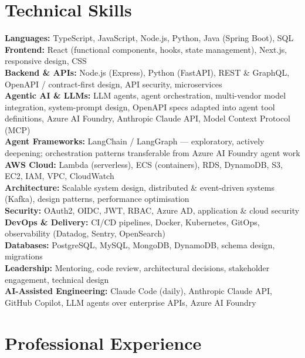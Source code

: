 \documentclass[11pt,a4paper]{article}
\begin{document}
\section*{Technical Skills}
\noindent
\textbf{Languages:} TypeScript, JavaScript, Node.js, Python, Java (Spring Boot), SQL\\
\textbf{Frontend:} React (functional components, hooks, state management), Next.js, responsive design, CSS\\
\textbf{Backend \& APIs:} Node.js (Express), Python (FastAPI), REST \& GraphQL, OpenAPI / contract-first design, API security, microservices\\
\textbf{Agentic AI \& LLMs:} LLM agents, agent orchestration, multi-vendor model integration, system-prompt design, OpenAPI specs adapted into agent tool definitions, Azure AI Foundry, Anthropic Claude API, Model Context Protocol (MCP)\\
\textbf{Agent Frameworks:} LangChain / LangGraph --- exploratory, actively deepening; orchestration patterns transferable from Azure AI Foundry agent work\\
\textbf{AWS Cloud:} Lambda (serverless), ECS (containers), RDS, DynamoDB, S3, EC2, IAM, VPC, CloudWatch\\
\textbf{Architecture:} Scalable system design, distributed \& event-driven systems (Kafka), design patterns, performance optimisation\\
\textbf{Security:} OAuth2, OIDC, JWT, RBAC, Azure AD, application \& cloud security\\
\textbf{DevOps \& Delivery:} CI/CD pipelines, Docker, Kubernetes, GitOps, observability (Datadog, Sentry, OpenSearch)\\
\textbf{Databases:} PostgreSQL, MySQL, MongoDB, DynamoDB, schema design, migrations\\
\textbf{Leadership:} Mentoring, code review, architectural decisions, stakeholder engagement, technical design\\
\textbf{AI-Assisted Engineering:} Claude Code (daily), Anthropic Claude API, GitHub Copilot, LLM agents over enterprise APIs, Azure AI Foundry

\section*{Professional Experience}
\end{document}
